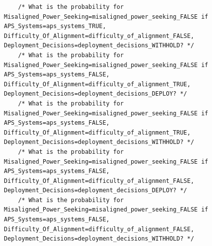 \documentclass[
  11pt,
  letterpaper,
]{book}
\begin{document}
\begin{verbatim}
    /* What is the probability for Misaligned_Power_Seeking=misaligned_power_seeking_FALSE if APS_Systems=aps_systems_TRUE, Difficulty_Of_Alignment=difficulty_of_alignment_FALSE, Deployment_Decisions=deployment_decisions_WITHHOLD? */
    /* What is the probability for Misaligned_Power_Seeking=misaligned_power_seeking_FALSE if APS_Systems=aps_systems_FALSE, Difficulty_Of_Alignment=difficulty_of_alignment_TRUE, Deployment_Decisions=deployment_decisions_DEPLOY? */
    /* What is the probability for Misaligned_Power_Seeking=misaligned_power_seeking_FALSE if APS_Systems=aps_systems_FALSE, Difficulty_Of_Alignment=difficulty_of_alignment_TRUE, Deployment_Decisions=deployment_decisions_WITHHOLD? */
    /* What is the probability for Misaligned_Power_Seeking=misaligned_power_seeking_FALSE if APS_Systems=aps_systems_FALSE, Difficulty_Of_Alignment=difficulty_of_alignment_FALSE, Deployment_Decisions=deployment_decisions_DEPLOY? */
    /* What is the probability for Misaligned_Power_Seeking=misaligned_power_seeking_FALSE if APS_Systems=aps_systems_FALSE, Difficulty_Of_Alignment=difficulty_of_alignment_FALSE, Deployment_Decisions=deployment_decisions_WITHHOLD? */

\end{verbatim}
\end{document}
